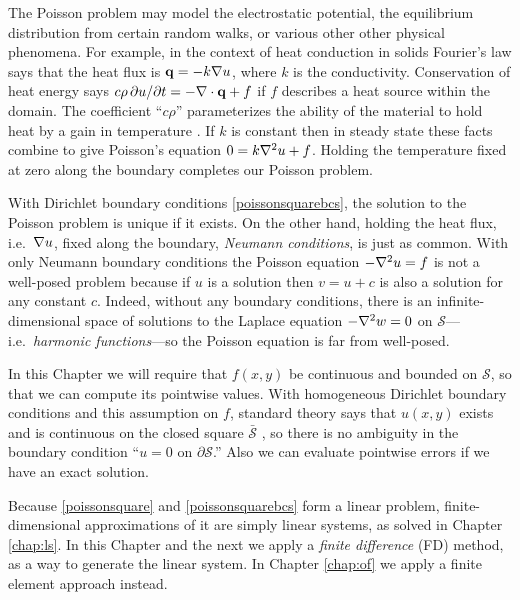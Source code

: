 The Poisson problem may model the electrostatic potential, the equilibrium distribution from certain random walks, or various other other physical phenomena.  For example, in the context of heat conduction in solids Fourier's law says that the heat flux is $\mathbf{q} = -k \nabla u$, where $k$ is the conductivity.  Conservation of heat energy says $c\rho\, \partial u/\partial t = - \nabla\cdot\mathbf{q} + f$ if $f$ describes a heat source within the domain.  The coefficient ``$c\rho$'' parameterizes the ability of the material to hold heat by a gain in temperature \citep{Ockendonetal2003}.  If $k$ is constant then in steady state these facts combine to give Poisson's equation $0 = k \nabla^2 u + f$.  Holding the temperature fixed at zero along the boundary completes our Poisson problem.

With Dirichlet boundary conditions \eqref{poissonsquarebcs}, the solution to the Poisson problem is unique if it exists.  On the other hand, holding the heat flux, i.e.~$\nabla u$, fixed along the boundary, \emph{Neumann conditions}, is just as common.  With only Neumann boundary conditions the Poisson equation $-\nabla^2 u = f$ is not a well-posed problem because if $u$ is a solution then $v=u+c$ is also a solution for any constant $c$.  Indeed, without any boundary conditions, there is an infinite-dimensional space of solutions to the Laplace equation $-\nabla^2 w = 0$ on $\mathcal{S}$---i.e.~\emph{harmonic functions}---so the Poisson equation is far from well-posed.

In this Chapter we will require that $f(x,y)$ be continuous and bounded on $\mathcal{S}$, so that we can compute its pointwise values.  With homogeneous Dirichlet boundary conditions and this assumption on $f$, standard theory says that $u(x,y)$ exists and is continuous on the closed square $\bar{\mathcal{S}}$ \citep[Theorem 6 in section 5.6]{Evans2010}, so there is no ambiguity in the boundary condition ``$u=0$ on $\partial \mathcal{S}$.''  Also we can evaluate pointwise errors if we have an exact solution. 

Because \eqref{poissonsquare} and \eqref{poissonsquarebcs} form a linear problem, finite-dimensional approximations of it are simply linear systems, as solved in Chapter \ref{chap:ls}. In this Chapter and the next we apply a \emph{finite difference} (FD) method, as a way to generate the linear system.  In Chapter \ref{chap:of} we apply a finite element approach instead.


